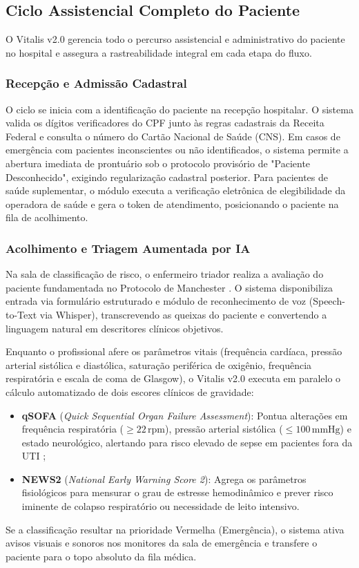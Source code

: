 \subsection{Ciclo Assistencial Completo do Paciente}
\label{subsec:ciclo_assistencial}

O Vitalis v2.0 gerencia todo o percurso assistencial e administrativo do paciente no hospital e assegura a rastreabilidade integral em cada etapa do fluxo.

\subsubsection{Recepção e Admissão Cadastral}
O ciclo se inicia com a identificação do paciente na recepção hospitalar. O sistema valida os dígitos verificadores do CPF junto às regras cadastrais da Receita Federal e consulta o número do Cartão Nacional de Saúde (CNS). Em casos de emergência com pacientes inconscientes ou não identificados, o sistema permite a abertura imediata de prontuário sob o protocolo provisório de "Paciente Desconhecido", exigindo regularização cadastral posterior. Para pacientes de saúde suplementar, o módulo executa a verificação eletrônica de elegibilidade da operadora de saúde e gera o token de atendimento, posicionando o paciente na fila de acolhimento.

\subsubsection{Acolhimento e Triagem Aumentada por IA}
Na sala de classificação de risco, o enfermeiro triador realiza a avaliação do paciente fundamentada no Protocolo de Manchester \cite{manchester:2014}. O sistema disponibiliza entrada via formulário estruturado e módulo de reconhecimento de voz (Speech-to-Text via Whisper), transcrevendo as queixas do paciente e convertendo a linguagem natural em descritores clínicos objetivos.

Enquanto o profissional afere os parâmetros vitais (frequência cardíaca, pressão arterial sistólica e diastólica, saturação periférica de oxigênio, frequência respiratória e escala de coma de Glasgow), o Vitalis v2.0 executa em paralelo o cálculo automatizado de dois escores clínicos de gravidade:
\begin{itemize}
    \item \textbf{qSOFA} (\textit{Quick Sequential Organ Failure Assessment}): Pontua alterações em frequência respiratória ($\ge 22\,\text{rpm}$), pressão arterial sistólica ($\le 100\,\text{mmHg}$) e estado neurológico, alertando para risco elevado de sepse em pacientes fora da UTI \cite{singer_sepsis:2016};
    \item \textbf{NEWS2} (\textit{National Early Warning Score 2}): Agrega os parâmetros fisiológicos para mensurar o grau de estresse hemodinâmico e prever risco iminente de colapso respiratório ou necessidade de leito intensivo.
\end{itemize}
Se a classificação resultar na prioridade Vermelha (Emergência), o sistema ativa avisos visuais e sonoros nos monitores da sala de emergência e transfere o paciente para o topo absoluto da fila médica.

